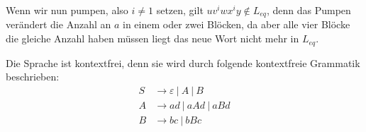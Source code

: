 \begin{aufgabe}
\begin{teile}
    Wenn wir nun pumpen, also $i \not= 1$ setzen, gilt $u v^i w x^i y \not\in L_{eq}$, denn das Pumpen verändert die Anzahl an $a$ in einem oder zwei Blöcken, 
    da aber alle vier Blöcke die gleiche Anzahl haben müssen liegt das neue Wort nicht mehr in $L_{eq}$.

    \item Die Sprache ist kontextfrei, denn sie wird durch folgende kontextfreie Grammatik beschrieben:
    \begin{align*}
        S &\rightarrow \varepsilon\ \vert \ A \ \vert \ B\\
        A &\rightarrow ad \ \vert \ aAd \ \vert \ aBd\\
        B &\rightarrow bc \ \vert \ bBc
    \end{align*}
    \end{teile}
\end{aufgabe}

